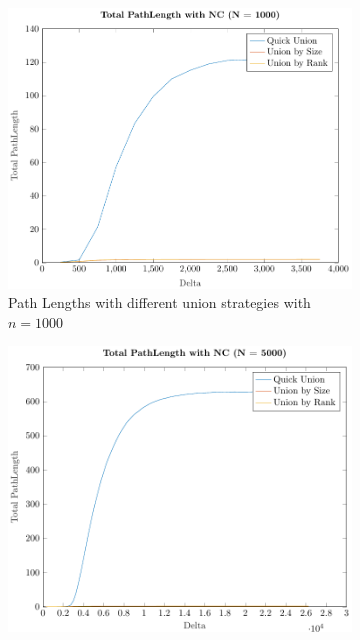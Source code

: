 \begin{figure}[ht]
    \centering
    \begin{subfigure}{0.32\textwidth}
        \centering
        \includegraphics[width=\textwidth]{../images/plotNCFull1000_PathLength.pdf}
        \caption{Path Lengths with different union strategies with $n = 1000$}
    \end{subfigure}%
    \hfill
    \begin{subfigure}{0.32\textwidth}
        \centering
        \includegraphics[width=\textwidth]{../images/plotNCFull5000_PathLength.pdf}

\end{subfigure}
\end{figure}
